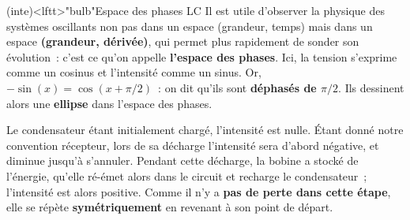 \documentclass[../../main/main.tex]{subfiles}
\begin{document}
\begin{tcb}(inte)<lftt>"bulb"{Espace des phases LC}
  Il est utile d'observer la physique des systèmes oscillants non pas dans un
  espace (grandeur, temps) mais dans un espace \textbf{(grandeur,
    dérivée)}, qui permet plus rapidement de sonder son évolution~: c'est ce
  qu'on appelle \textbf{l'espace des phases}.
  \bigbreak
  Ici, la tension s'exprime comme un cosinus et l'intensité comme un sinus. Or,
  $-\sin(x) = \cos(x+\pi/2)$~: on dit qu'ils sont \textbf{déphasés de $\pi/2$}.
  Ils dessinent alors une \textbf{ellipse} dans l'espace des phases.
  \tcblower
  \begin{isd}[righthand ratio=.3]
      Le condensateur étant initialement chargé, l'intensité est nulle. Étant donné
    notre convention récepteur, lors de sa décharge l'intensité sera d'abord
    négative, et diminue jusqu'à s'annuler.
    \bigbreak
    Pendant cette décharge, la bobine a stocké de l'énergie, qu'elle ré-émet alors
    dans le circuit et recharge le condensateur~; l'intensité est alors positive.
    \bigbreak
    Comme il n'y a \textbf{pas de perte dans cette étape}, elle se répète
    \textbf{symétriquement} en revenant à son point de départ.
    \tcblower
    \begin{center}
\end{center}
\end{isd}
\end{tcb}
\end{document}
